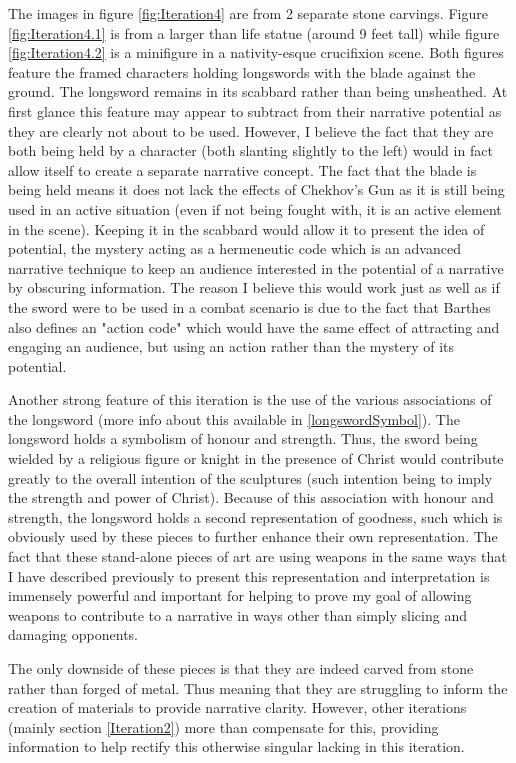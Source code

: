 \documentclass{article}
\begin{document}
The images in figure \ref{fig:Iteration4} are from 2 separate stone carvings. Figure \ref{fig:Iteration4.1} is from a larger than life statue (around 9 feet tall) while figure \ref{fig:Iteration4.2} is a minifigure in a nativity-esque crucifixion scene. Both figures feature the framed characters holding longswords with the blade against the ground. The longsword remains in its scabbard rather than being unsheathed. At first glance this feature may appear to subtract from their narrative potential as they are clearly not about to be used. However, I believe the fact that they are both being held by a character (both slanting slightly to the left) would in fact allow itself to create a separate narrative concept. The fact that the blade is being held means it does not lack the effects of Chekhov's Gun \parencite{delaney1990chekhov} as it is still being used in an active situation (even if not being fought with, it is an active element in the scene). Keeping it in the scabbard would allow it to present the idea of potential, the mystery acting as a hermeneutic code \parencite{barthes1972semiotics} which is an advanced narrative technique to keep an audience interested in the potential of a narrative by obscuring information. The reason I believe this would work just as well as if the sword were to be used in a combat scenario is due to the fact that Barthes also defines an "action code" which would have the same effect of attracting and engaging an audience, but using an action rather than the mystery of its potential.

Another strong feature of this iteration is the use of the various associations of the longsword (more info about this available in \ref{longswordSymbol}). The longsword holds a symbolism of honour and strength. Thus, the sword being wielded by a religious figure or knight in the presence of Christ would contribute greatly to the overall intention of the sculptures (such intention being to imply the strength and power of Christ). Because of this association with honour and strength, the longsword holds a second representation of goodness, such which is obviously used by these pieces to further enhance their own representation. The fact that these stand-alone pieces of art are using weapons in the same ways that I have described previously to present this representation and interpretation is immensely powerful and important for helping to prove my goal of allowing weapons to contribute to a narrative in ways other than simply slicing and damaging opponents.

The only downside of these pieces is that they are indeed carved from stone rather than forged of metal. Thus meaning that they are struggling to inform the creation of materials to provide narrative clarity. However, other iterations (mainly section \ref{Iteration2}) more than compensate for this, providing information to help rectify this otherwise singular lacking in this iteration.
\end{document}
